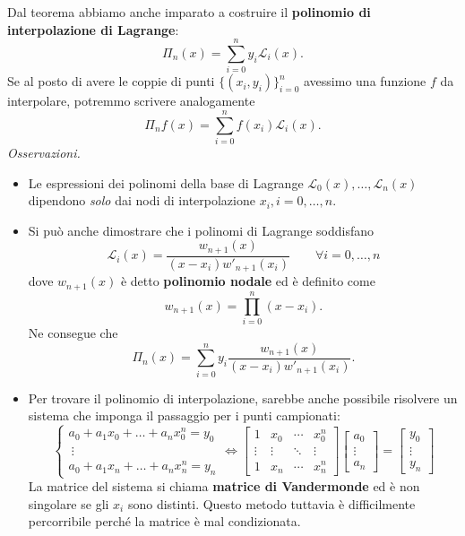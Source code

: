 Dal teorema abbiamo anche imparato a costruire il \textbf{polinomio di interpolazione di Lagrange}:
\begin{equation*}
\Pi _{n}(x) =\sum ^{n}_{i=0} y_{i}\mathcal{L}_{i}(x).
\end{equation*}
Se al posto di avere le coppie di punti $\{( x_{i} ,y_{i})\}^{n}_{i=0}$ avessimo una funzione $f$ da interpolare, potremmo scrivere analogamente
\begin{equation*}
\Pi _{n} f(x) =\sum ^{n}_{i=0} f( x_{i})\mathcal{L}_{i}(x).
\end{equation*}
\textit{Osservazioni.}
\begin{itemize}
\item Le espressioni dei polinomi della base di Lagrange $\mathcal{L}_{0}(x) ,\dotsc ,\mathcal{L}_{n}(x)$ dipendono \textit{solo} dai nodi di interpolazione $x_{i} ,i=0,\dotsc ,n$.
\item Si può anche dimostrare che i polinomi di Lagrange soddisfano
\begin{equation*}
\mathcal{L}_{i}(x) =\frac{w_{n+1}(x)}{( x-x_{i}) w'_{n+1}( x_{i})} \qquad \forall i=0,\dotsc ,n
\end{equation*}
dove $w_{n+1}(x)$ è detto \textbf{polinomio nodale} ed è definito come
\begin{equation*}
w_{n+1}(x) =\prod ^{n}_{i=0}( x-x_{i}).
\end{equation*}
Ne consegue che
\begin{equation*}
\Pi _{n}(x) =\sum\limits ^{n}_{i=0} y_{i}\frac{w_{n+1}(x)}{( x-x_{i}) w'_{n+1}( x_{i})}.
\end{equation*}
\item Per trovare il polinomio di interpolazione, sarebbe anche possibile risolvere un sistema che imponga il passaggio per i punti campionati:
\begin{equation*}
    \begin{cases}
        a_0 +a_1x_0+\dots+a_nx_0^n=y_0\\
        \ \vdots \\
        a_0+a_1x_n+\dots+a_nx_n^n=y_n
    \end{cases}
    \iff
    \begin{bmatrix}
        1 & x_0 & \cdots & x_0^n\\
        \vdots&\vdots&\ddots&\vdots\\
        1 & x_n & \cdots & x_n^n
    \end{bmatrix}
    \begin{bmatrix}
        a_0\\
        \vdots\\
        a_n
    \end{bmatrix}=
    \begin{bmatrix}
        y_0\\
        \vdots\\
        y_n
    \end{bmatrix}
\end{equation*}
La matrice del sistema si chiama \textbf{matrice di Vandermonde} ed è non singolare se gli $x_i$ sono distinti. Questo metodo tuttavia è difficilmente percorribile perché la matrice è mal condizionata.
\end{itemize}
